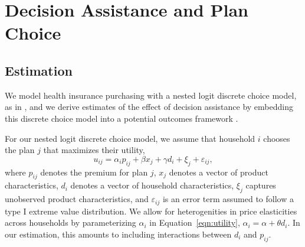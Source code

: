 \documentclass[12pt]{article}
\begin{document}
\section{Decision Assistance and Plan Choice}
\label{sec:causal}

\subsection{Estimation}
\label{subsec:causal-methods}
We model health insurance purchasing with a nested logit discrete choice model, as in \cite{saltzman2019}, and we derive estimates of the effect of decision assistance by embedding this discrete choice model into a potential outcomes framework \citep{rubin1974, imbens2009}.

For our nested logit discrete choice model, we assume that household $i$ chooses the plan $j$ that maximizes their utility,
\begin{equation}
u_{ij} = \alpha_{i}p_{ij} + \beta x_{j} + \gamma d_{i} + \xi_{j} + \varepsilon_{ij}, 
\label{eqn:utility}
\end{equation}
where $p_{ij}$ denotes the premium for plan $j$, $x_{j}$ denotes a vector of product characteristics, $d_{i}$ denotes a vector of household characteristics, $\xi_{j}$ captures unobserved product characteristics, and $\varepsilon_{ij}$ is an error term assumed to follow a type I extreme value distribution. We allow for heterogenities in price elasticities across households by parameterizing $\alpha_{i}$ in Equation~\eqref{eqn:utility}, $\alpha_{i} = \alpha + \theta d_{i}.$ In our estimation, this amounts to including interactions between $d_{i}$ and $p_{ij}$.
\end{document}
